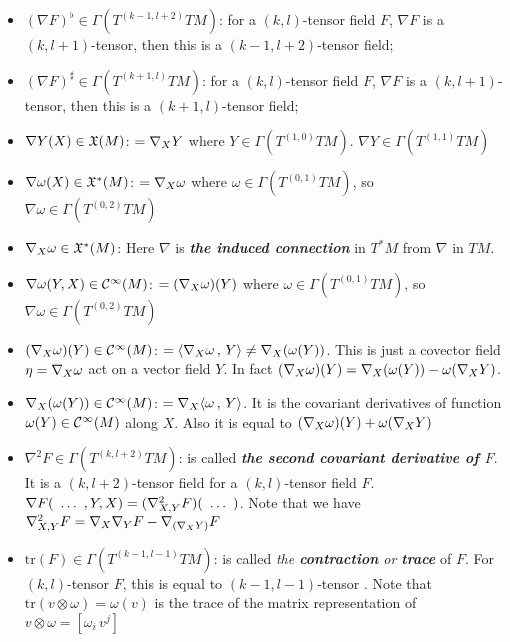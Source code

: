 \documentclass[11pt]{article}
\begin{document}
\begin{itemize}
\item $(\nabla F)^{\flat}  \in \Gamma(T^{(k-1, l+2)}TM)$: \quad for a $(k,l)$-tensor field $F$, $\nabla F$ is a $(k,l+1)$-tensor, then this is a $(k-1, l+2)$-tensor field;

\item $(\nabla F)^{\sharp}  \in \Gamma(T^{(k+1, l)}TM)$: \quad for a $(k,l)$-tensor field $F$, $\nabla F$ is a $(k,l+1)$-tensor,  then this is a $(k+1, l)$-tensor field;

\item $\nabla Y(X) \in {\mathfrak X}(M)$: \quad $=\nabla_{X}{Y}$ where $Y \in \Gamma(T^{(1,0)}TM)$. $\nabla Y \in  \Gamma(T^{(1,1)}TM)$

\item $\nabla \omega(X) \in {\mathfrak X}^{*}(M)$: \quad $= \nabla_{X}{\omega}$ where $\omega \in \Gamma(T^{(0,1)}TM)$, so $\nabla \omega \in \Gamma(T^{(0,2)}TM)$

\item $\nabla_{X}{\omega} \in {\mathfrak X}^{*}(M)$: \quad Here $\nabla$ is \emph{\textbf{the induced connection}} in $T^{*}M$ from $\nabla$ in $TM$. 

\item $\nabla \omega(Y, X) \in {\mathcal C}^{\infty}(M)$: \quad $= (\nabla_{X}{\omega})(Y)$ where $\omega \in \Gamma(T^{(0,1)}TM)$, so $\nabla \omega \in \Gamma(T^{(0,2)}TM)$


\item $(\nabla_{X}{\omega})(Y) \in {\mathcal C}^{\infty}(M)$: \quad $= \left\langle \nabla_{X}{\omega}\,,\, Y \right\rangle \neq \nabla_{X}{(\omega(Y))}$. This is just a covector field $\eta = \nabla_{X}{\omega}$ act on a vector field $Y$. In fact $(\nabla_{X}{\omega})(Y) = \nabla_{X}{(\omega(Y))} - \omega(\nabla_{X}{Y})$.

\item $\nabla_{X}{(\omega(Y))} \in {\mathcal C}^{\infty}(M)$: \quad $= \nabla_{X}{\left\langle \omega\,,\, Y \right\rangle} $. It is the covariant derivatives of function $\omega(Y) \in {\mathcal C}^{\infty}(M)$ along $X$. Also it is equal to $(\nabla_{X}{\omega})(Y) + \omega(\nabla_{X}{Y})$


\item $\nabla^2 F \in \Gamma(T^{(k, l+2)}TM)$:  \quad is called \emph{\textbf{the second covariant derivative of $F$}}. It is a $(k, l+2)$-tensor field for a $(k,l)$-tensor field $F$.  $\nabla F(\,{\,}\ldots{\,}\,, Y, X) =( \nabla^2_{X, Y}F)(\,{\,}\ldots{\,}\,)$. Note that we have $\nabla^2_{X, Y}F = \nabla_{X}{\nabla_{Y}{F}} - \nabla_{(\nabla_{X}{Y})}{F}$


\item $\text{tr}(F) \in \Gamma(T^{(k-1, l-1)}TM)$: \quad is called \emph{the \textbf{contraction} or \textbf{trace}} of $F$. For $(k, l)$-tensor $F$, this is equal to $(k-1, l-1)$-tensor  . Note that $\text{tr}(v \otimes \omega) = \omega(v)$ is the trace of the matrix representation of $v\otimes \omega = [\omega_i\,v^j]$


\end{itemize}
\end{document}
